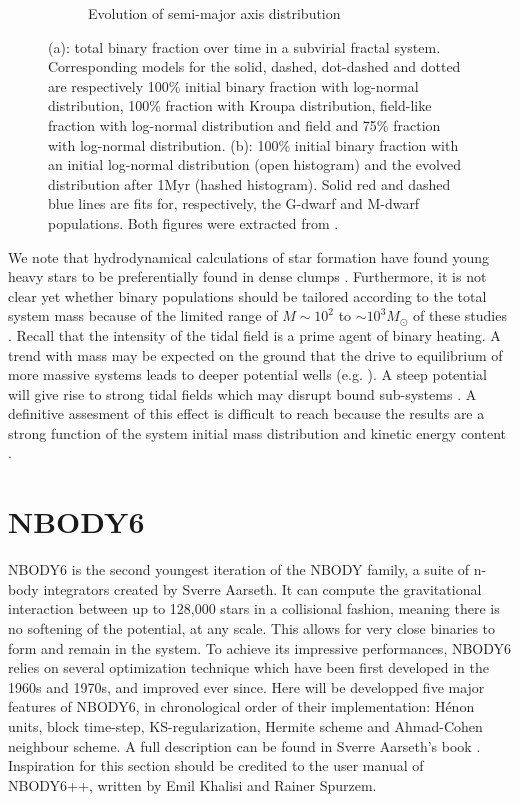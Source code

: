 \begin{figure}
\begin{subfigure}[b]{0.48\textwidth}
        \caption{Evolution of semi-major axis distribution}
        \label{Fig:0_binsim_2}
    \end{subfigure}
\caption{(a): total binary fraction over time in a subvirial fractal system. Corresponding models for the solid, dashed, dot-dashed and dotted are respectively 100\% initial binary fraction with log-normal distribution, 100\% fraction with Kroupa distribution, field-like fraction with log-normal distribution and field and 75\% fraction with log-normal distribution. (b): 100\% initial binary fraction with an initial log-normal distribution (open histogram) and the evolved distribution after 1Myr (hashed histogram). Solid red and dashed blue lines are fits for, respectively, the G-dwarf and M-dwarf populations. Both figures were extracted from \cite{Parker2011}.}
\label{Fig:0_binsimulation}
\end{figure}

 
 
  We note that hydrodynamical calculations of star formation have found young heavy stars to be preferentially found in dense clumps \citep{Maschberger2010}. Furthermore, it is not clear yet whether binary populations should be tailored according to the total system mass because of the limited range of $M \sim 10^2$ to $ \sim 10^3 M_\odot$ of these studies \citep{Kroupa2001,Parker2011,Parker2014}. Recall that the intensity of the tidal field is a prime agent of binary heating.  A trend with mass may be expected on the ground that the drive to equilibrium of more massive systems leads to deeper potential wells (e.g. \citealt{Aarseth1988,Boily2002}). A steep potential will give rise to strong tidal fields which may disrupt bound sub-systems \citep{Boily2004,Renaud2011}. A definitive assesment of this effect is difficult to reach because the results are a strong function of the system initial mass distribution and kinetic energy content \citep{Boily2002,Caputo2014}.





\section{NBODY6}


NBODY6 is the second youngest iteration of the NBODY family, a suite of n-body integrators created by Sverre Aarseth. It can compute the gravitational interaction between up to 128,000 stars in a collisional fashion, meaning there is no softening of the potential, at any scale. This allows for very close binaries to form and remain in the system. To achieve its impressive performances, NBODY6 relies on several optimization technique which have been first developed in the 1960s and 1970s, and improved ever since. Here will be developped five major features of NBODY6, in chronological order of their implementation: H\'enon units, block time-step, KS-regularization, Hermite scheme and Ahmad-Cohen neighbour scheme. A full description can be found in Sverre Aarseth's book \citep{Aarseth2003}. Inspiration for this section should be credited to the user manual of NBODY6++, written by Emil Khalisi and Rainer Spurzem.

